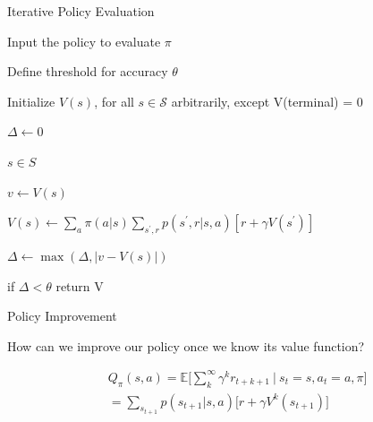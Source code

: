 \documentclass{beamer}
\begin{document}
\begin{frame}{Iterative Policy Evaluation}


\begin{algorithm}[H]
\caption{Iterative Policy Evaluation}


\vspace{1mm}
Input the policy to evaluate $\pi$

\vspace{0.5mm}

Define threshold for accuracy $\theta$

\vspace{0.5mm}

Initialize $V(s)$, for all $s \in \mathcal{S}$ arbitrarily, except V(terminal) = 0

\vspace{4mm}

$\Delta \leftarrow 0$
 

 \textbf{}  

 \hspace{5mm}  \textbf{}  $s \in S$
   
   \vspace{0.5mm}
   
   \hspace{15mm} $v \leftarrow V(s)$
   
   \vspace{0.7mm}
   
   \hspace{15mm} $V(s) \leftarrow \sum_{a} \pi(a|s) \sum_{s^{\prime}, r} p(s^{\prime}, r | s, a)[r + \gamma V(s^{\prime})]$
   
   \vspace{0.7mm}
   
   \hspace{15mm} $\Delta \leftarrow \max(\Delta, |v - V(s)|)$
   
   \vspace{0.5mm}
   
   \hspace{5mm} if $\Delta < \theta$ return V
   \vspace{1mm}
   

\end{algorithm}

\end{frame}

\begin{frame}{Policy Improvement}

How can we improve our policy once we know its value function?

\begin{align*}
    &Q_{\pi}(s,a) = \mathds{E} \bigg[\sum_{k}^{\infty}\gamma^{k} r_{t+k+1} \: \bigg| \: s_t=s, a_t=a,\pi \bigg] \\
		   & =  \sum_{s_{t+1}} p(s_{t+1}|s,a)\big[r + \gamma V^{k}(s_{t+1}) \big]
\end{align*}

\end{frame}
\end{document}
